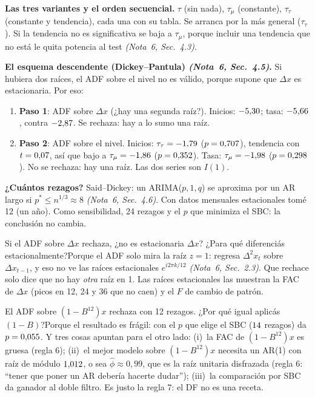 \documentclass[11pt,a4paper]{article}
\newcommand{\nota}[2]{\textit{(Nota~#1, Sec.~#2)}}
\newcommand{\Q}[2]{\begin{pregunta}{#1}#2\end{pregunta}}
\begin{document}
\textbf{Las tres variantes y el orden secuencial.} $\tau$ (sin nada), $\tau_\mu$ (constante), $\tau_\tau$ (constante y tendencia), cada una con su tabla. Se arranca por la m\'as general ($\tau_\tau$). Si la tendencia no es significativa se baja a $\tau_\mu$, porque incluir una tendencia que no est\'a le quita potencia al test \nota{6}{4.3}.

\textbf{El esquema descendente (Dickey--Pantula) \nota{6}{4.5}.} Si hubiera dos ra\'ices, el ADF sobre el nivel no es v\'alido, porque supone que $\Delta x$ es estacionaria. Por eso:
\begin{enumerate}[leftmargin=1.4em]
\item \textbf{Paso 1}: ADF sobre $\Delta x$ (¿hay una segunda ra\'iz?). Inicios: $-5{,}30$; tasa: $-5{,}66$, contra $-2{,}87$. Se rechaza: hay a lo sumo una ra\'iz.
\item \textbf{Paso 2}: ADF sobre el nivel. Inicios: $\tau_\tau=-1{,}79$ ($p=0{,}707$), tendencia con $t=0{,}07$, as\'i que bajo a $\tau_\mu=-1{,}86$ ($p=0{,}352$). Tasa: $\tau_\mu=-1{,}98$ ($p=0{,}298$). No se rechaza: hay una ra\'iz. Las dos series son $I(1)$.
\end{enumerate}

\textbf{¿Cu\'antos rezagos?} Said--Dickey: un ARIMA($p,1,q$) se aproxima por un AR largo si $p^*\le n^{1/3}\approx8$ \nota{6}{4.6}. Con datos mensuales estacionales tom\'e 12 (un a\~no). Como sensibilidad, 24 rezagos y el $p$ que minimiza el SBC: la conclusi\'on no cambia.

\Q{Si el ADF sobre $\Delta x$ rechaza, ¿no es estacionaria $\Delta x$? ¿Para qu\'e diferenci\'as estacionalmente?}{Porque el ADF solo mira la ra\'iz $z=1$: regresa $\Delta^2x_t$ sobre $\Delta x_{t-1}$, y eso no ve las ra\'ices estacionales $e^{i2\pi k/12}$ \nota{6}{2.3}. Que rechace solo dice que no hay \emph{otra} ra\'iz en 1. Las ra\'ices estacionales las muestran la FAC de $\Delta x$ (picos en 12, 24 y 36 que no caen) y el $F$ de cambio de patr\'on.}

\Q{El ADF sobre $(1-B^{12})x$ rechaza con 12 rezagos. ¿Por qu\'e igual aplic\'as $(1-B)$?}{Porque el resultado es fr\'agil: con el $p$ que elige el SBC ($14$ rezagos) da $p=0{,}055$. Y tres cosas apuntan para el otro lado: (i)~la FAC de $(1-B^{12})x$ es gruesa (regla 6); (ii)~el mejor modelo sobre $(1-B^{12})x$ necesita un AR(1) con ra\'iz de m\'odulo $1{,}012$, o sea $\hat\phi\approx0{,}99$, que es la ra\'iz unitaria disfrazada (regla 6: ``tener que poner un AR deber\'ia hacerte dudar''); (iii)~la comparaci\'on por SBC da ganador al doble filtro. Es justo la regla 7: el DF no es una receta.}
\end{document}
